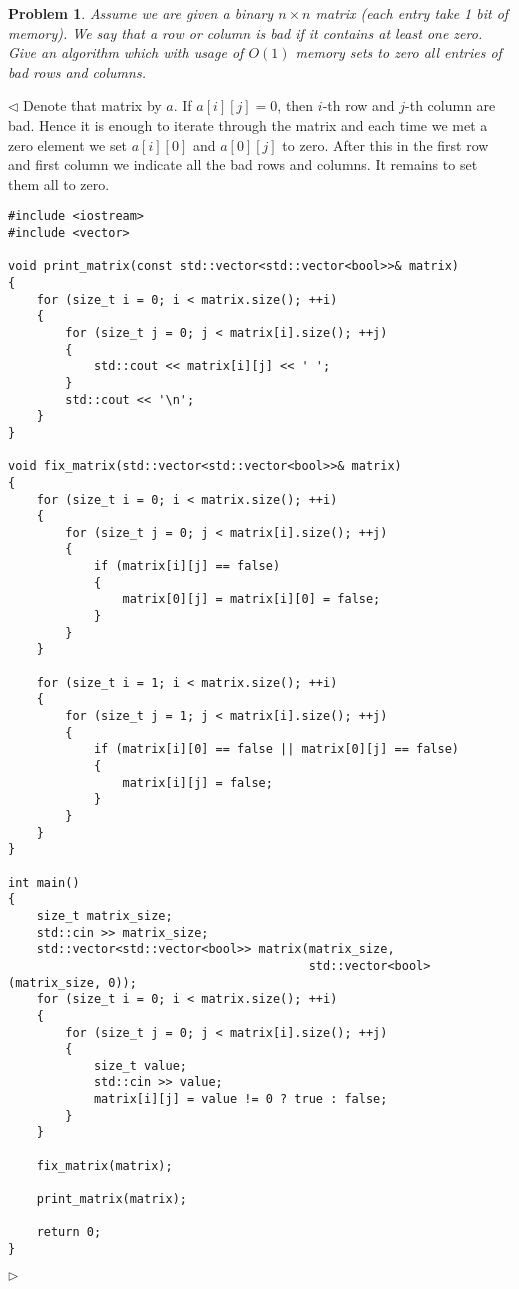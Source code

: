 \documentclass[12pt]{article}
\newtheorem{problem}{Problem}[subsection]
\newenvironment{solution}{\par $\triangleleft$}{$\triangleright$}
\begin{document}
\begin{problem} Assume we are given a binary $n\times n$ matrix (each entry take
1 bit of memory). We say that a row or column is bad if it contains at least one
zero. Give an algorithm which with usage of $O(1)$ memory sets to zero all
entries of bad rows and columns.
\end{problem}
\begin{solution} Denote that matrix by $a$. If $a[i][j]=0$, then $i$-th row and
    $j$-th column are bad. Hence it is enough to iterate through the matrix and
    each time we met a zero element we set $a[i][0]$ and $a[0][j]$ to zero.
    After this in the first row and first column we indicate all the bad rows
    and columns. It remains to set them all to zero.
    \begin{verbatim}
#include <iostream>
#include <vector>

void print_matrix(const std::vector<std::vector<bool>>& matrix)
{
    for (size_t i = 0; i < matrix.size(); ++i)
    {
        for (size_t j = 0; j < matrix[i].size(); ++j)
        {
            std::cout << matrix[i][j] << ' ';
        }
        std::cout << '\n';
    }
}

void fix_matrix(std::vector<std::vector<bool>>& matrix)
{
    for (size_t i = 0; i < matrix.size(); ++i)
    {
        for (size_t j = 0; j < matrix[i].size(); ++j)
        {
            if (matrix[i][j] == false)
            {
                matrix[0][j] = matrix[i][0] = false;
            }
        }
    }

    for (size_t i = 1; i < matrix.size(); ++i)
    {
        for (size_t j = 1; j < matrix[i].size(); ++j)
        {
            if (matrix[i][0] == false || matrix[0][j] == false)
            {
                matrix[i][j] = false;
            }
        }
    }
}

int main()
{
    size_t matrix_size;
    std::cin >> matrix_size;
    std::vector<std::vector<bool>> matrix(matrix_size,
                                          std::vector<bool>(matrix_size, 0));
    for (size_t i = 0; i < matrix.size(); ++i)
    {
        for (size_t j = 0; j < matrix[i].size(); ++j)
        {
            size_t value;
            std::cin >> value;
            matrix[i][j] = value != 0 ? true : false;
        }
    }

    fix_matrix(matrix);

    print_matrix(matrix);

    return 0;
}
    \end{verbatim}
\end{solution}
\end{document}
